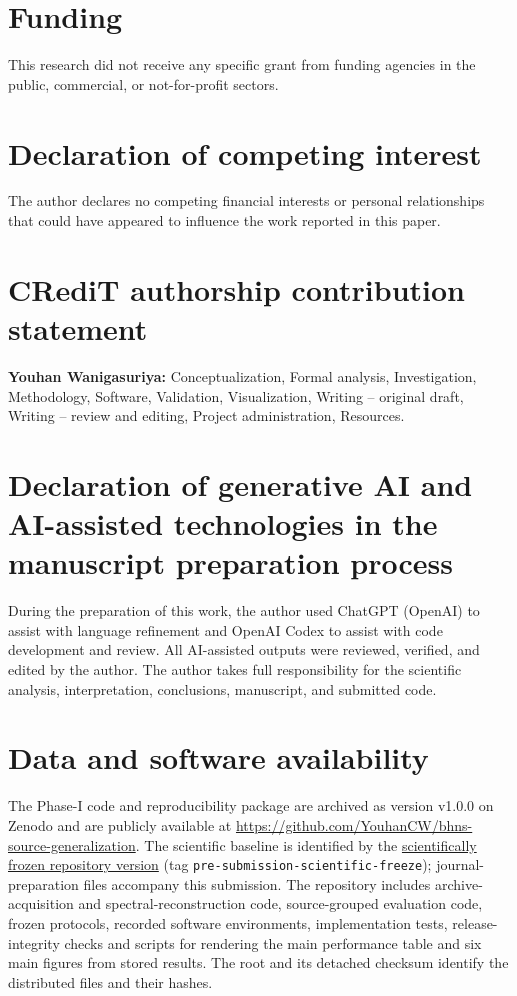 \documentclass[final,5p,authoryear,nopreprintline]{elsarticle}
\begin{document}
\section*{Funding}

This research did not receive any specific grant from funding agencies in the public, commercial, or not-for-profit sectors.

\section*{Declaration of competing interest}

The author declares no competing financial interests or personal relationships that could have appeared to influence the work reported in this paper.

\section*{CRediT authorship contribution statement}

\textbf{Youhan Wanigasuriya:} Conceptualization, Formal analysis, Investigation, Methodology, Software, Validation, Visualization, Writing -- original draft, Writing -- review and editing, Project administration, Resources.

\section*{Declaration of generative AI and AI-assisted technologies in the manuscript preparation process}

During the preparation of this work, the author used ChatGPT (OpenAI) to assist with language refinement and OpenAI Codex to assist with code development and review. All AI-assisted outputs were reviewed, verified, and edited by the author. The author takes full responsibility for the scientific analysis, interpretation, conclusions, manuscript, and submitted code.

\section*{Data and software availability}

The Phase-I code and reproducibility package are archived as version v1.0.0 on Zenodo \citep[DOI: \href{https://doi.org/10.5281/zenodo.23040384}{10.5281/zenodo.23040384}]{Wanigasuriya2026BHNSRelease} and are publicly available at \url{https://github.com/YouhanCW/bhns-source-generalization}. The scientific baseline is identified by the \href{https://github.com/YouhanCW/bhns-source-generalization/tree/3c5bb50b1820ef89f816fc2f4da0fb6c69f359f7}{scientifically frozen repository version} (tag \texttt{pre-submission-scientific-freeze}); journal-preparation files accompany this submission. The repository includes archive-acquisition and spectral-reconstruction code, source-grouped evaluation code, frozen protocols, recorded software environments, implementation tests, release-integrity checks and scripts for rendering the main performance table and six main figures from stored results. The root  and its detached checksum identify the distributed files and their hashes.
\end{document}
